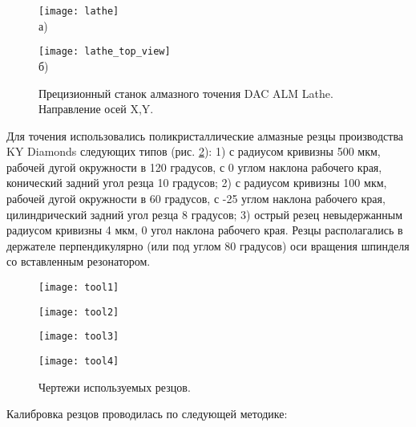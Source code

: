 \begin{figure}[ht]
  \begin{minipage}[ht]{0.49\linewidth}\centering
    \texttt{[image: lathe]} \\ а)
  \end{minipage}
  \hfill
  \begin{minipage}[ht]{0.49\linewidth}\centering
    \texttt{[image: lathe\_top\_view]} \\ б)
  \end{minipage}
  \caption{Прецизионный станок алмазного точения DAC ALM Lathe. Направление осей X,Y.}
  \label{lathe}
\end{figure}

Для точения использовались поликристаллические алмазные резцы производства KY Diamonds следующих типов (рис. \ref{diamond_tools}): 1) с радиусом кривизны 500 мкм, рабочей дугой окружности в 120 градусов, с 0 углом наклона рабочего края, конический задний угол резца 10 градусов; 2) с радиусом кривизны 100 мкм, рабочей дугой окружности в 60 градусов, с -25 углом наклона рабочего края, цилиндрический задний угол резца 8 градусов; 3) острый резец невыдержанным радиусом кривизны 4 мкм, 0 угол наклона рабочего края.  Резцы располагались в держателе перпендикулярно (или под углом 80 градусов) оси вращения шпинделя со вставленным резонатором.

\begin{figure}[ht]
  \begin{minipage}[ht]{0.24\linewidth}\centering
    \texttt{[image: tool1]}
  \end{minipage}
  \hfill
  \begin{minipage}[ht]{0.24\linewidth}\centering
    \texttt{[image: tool2]}
  \end{minipage}
  \hfill
  \begin{minipage}[ht]{0.24\linewidth}\centering
    \texttt{[image: tool3]}
  \end{minipage}
  \hfill
  \begin{minipage}[ht]{0.24\linewidth}\centering
    \texttt{[image: tool4]}
  \end{minipage}
  \caption{Чертежи используемых резцов.}
  \label{diamond_tools}
\end{figure}

Калибровка резцов проводилась по следующей методике:

